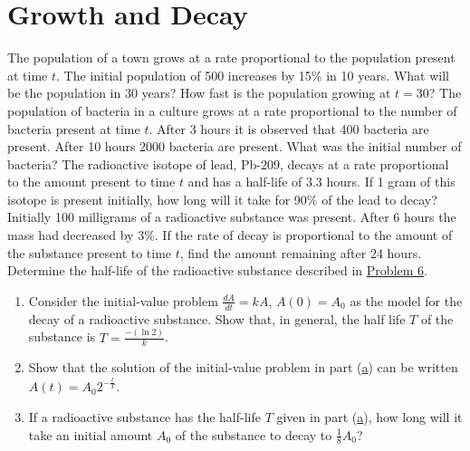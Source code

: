 \documentclass[12pt]{report}
\begin{document}
\section{Growth and Decay}\label{sec:growth-and-decay}
\begin{enumerate}[label=\arabic*., start=3]
	 The population of a town grows at a rate proportional to the population present at time $t$. The initial population of 500 increases by 15\% in 10 years. What will be the population in 30 years? How fast is the population growing at $t=30$?
	 The population of bacteria in a culture grows at a rate proportional to the number of bacteria present at time $t$. After 3 hours it is observed that 400 bacteria are present. After 10 hours 2000 bacteria are present. What was the initial number of bacteria?
	 The radioactive isotope of lead, Pb-209, decays at a rate proportional to the amount present to time $t$ and has a half-life of 3.3 hours. If 1 gram of this isotope is present initially, how long will it take for 90\% of the lead to decay?
	 Initially 100 milligrams of a radioactive substance was present. After 6 hours the mass had decreased by 3\%. If the rate of decay is proportional to the amount of the substance present to time $t$, find the amount remaining after 24 hours.
	 Determine the half-life of the radioactive substance described in \hyperref[prb:6]{Problem 6}.
	 \begin{enumerate}[label=(\alph*)]
	    \item\label{prb:8a} Consider the initial-value problem $\frac{dA}{dt}=kA$, $A(0)=A_{0}$ as the model for the decay of a radioactive substance. Show that, in general, the half life $T$ of the substance is $T=\frac{-(\ln2)}{k}$.
		\item Show that the solution of the initial-value problem in part (\hyperref[prb:8a]{a}) can be written $A(t) = A_{0}2^{-\frac{t}{T}}$.
		\item If a radioactive substance has the half-life $T$ given in part (\hyperref[prb:8a]{a}), how long will it take an initial amount $A_{0}$ of the substance to decay to $\frac{1}{8}A_{0}$?
	\end{enumerate}
\end{enumerate}
\end{document}

